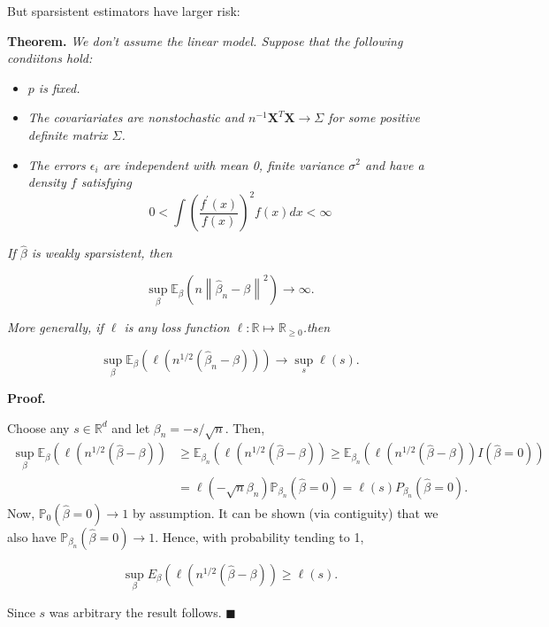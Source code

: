 \documentclass[
]{book}
\providecommand{\tightlist}{%
  \setlength{\itemsep}{0pt}\setlength{\parskip}{0pt}}
\begin{document}
But sparsistent estimators have larger risk:

\textbf{Theorem.} \emph{We don't assume the linear model. Suppose that the following condiitons hold:}

\begin{itemize}
\tightlist
\item
  \emph{\(p\) is fixed.}
\item
  \emph{The covariariates are nonstochastic and \(n^{-1} \mathbf{X}^T \mathbf{X} \rightarrow \Sigma\) for some positive definite matrix \(\Sigma\).}
\item
  \emph{The errors \(\epsilon_i\) are independent with mean 0, finite variance \(\sigma^2\) and have a density \(f\) satisfying }
  \[
    0<\int\left(\frac{f^{\prime}(x)}{f(x)}\right)^2 f(x) d x<\infty
    \]
\end{itemize}

\emph{If \(\widehat{\beta}\) is weakly sparsistent, then}

\[
\sup _\beta \mathbb E_\beta\left(n\left\|\widehat{\beta}_n-\beta\right\|^2\right) \rightarrow \infty .
\]

\emph{More generally, if \(\ell\) is any loss function \(\ell: \mathbb R \mapsto \mathbb R_{\geq 0}\).then }

\[
\sup _\beta  \mathbb E_\beta\left(\ell\left(n^{1 / 2}\left(\widehat{\beta}_n-\beta\right)\right)\right) \rightarrow \sup _s \ell(s) .
\]

\textbf{Proof.}

Choose any \(s \in \mathbb{R}^d\) and let \(\beta_n=-s / \sqrt{n}\). Then,
\begin{align*}
\sup _\beta \mathbb E_\beta\left(\ell\left(n^{1 / 2}(\widehat{\beta}-\beta)\right)\right. & \geq \mathbb E_{\beta_n}\left(\ell\left(n^{1 / 2}(\widehat{\beta}-\beta)\right) \geq \mathbb E_{\beta_n}\left(\ell\left(n^{1 / 2}(\widehat{\beta}-\beta)\right) I(\widehat{\beta}=0)\right)\right. \\
& =\ell\left(-\sqrt{n} \beta_n\right) \mathbb P_{\beta_n}(\widehat{\beta}=0)=\ell(s) P_{\beta_n}(\widehat{\beta}=0) .
\end{align*}
Now, \(\mathbb P_0(\widehat{\beta}=0) \rightarrow 1\) by assumption. It can be shown (via contiguity) that we also have \(\mathbb P_{\beta_n}(\widehat{\beta}=0) \rightarrow 1 .\) Hence, with probability tending to 1,

\[
\sup _\beta E_\beta\left(\ell\left(n^{1 / 2}(\widehat{\beta}-\beta)\right) \geq \ell(s) .\right.
\]

Since \(s\) was arbitrary the result follows. \(\blacksquare\)
\end{document}
